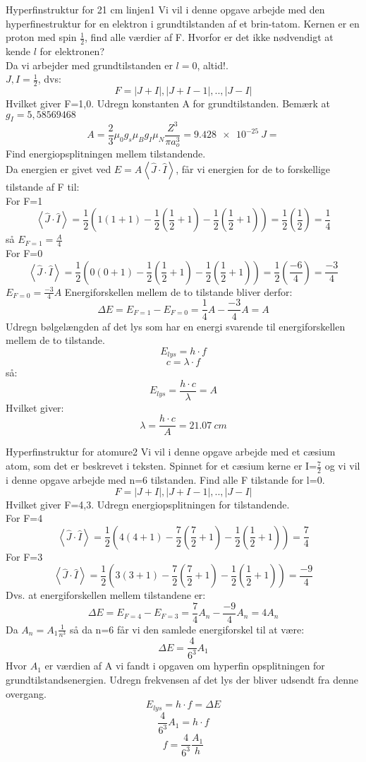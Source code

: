 \begin{opgave}{Hyperfinstruktur for 21 cm linjen}{1}
Vi vil i denne opgave arbejde med den hyperfinestruktur for en elektron i grundtilstanden af et brin-tatom.
\opg Kernen er en proton med spin $\frac{1}{2}$, find alle værdier af F. Hvorfor er det ikke nødvendigt at kende $l$ for elektronen?\\
Da vi arbejder med grundtilstanden er $l=0$, altid!.\\
$J,I=\frac{1}{2}$, dvs:
$$F=|J+I|,|J+I-1|,..,|J-I|$$
Hvilket giver F=1,0.
\opg Udregn konstanten A for grundtilstanden.
 Bemærk at $g_I = 5,58569468$
$$A=\frac{2}{3}\mu_0g_s\mu_Bg_I\mu_N\frac{Z^3}{\pi a_o^3}=\SI{9,428e-25}{J} =$$
\opg Find energiopsplitningen mellem tilstandende.\\
Da energien er givet ved $E=A\left<\hat{J}\cdot\hat{I}\right>$, får vi energien for de to forskellige tilstande af F til:\\
For F=1
$$\left<\hat{J}\cdot\hat{I}\right>=\frac{1}{2}(1(1+1)-\frac{1}{2}(\frac{1}{2}+1)-\frac{1}{2}(\frac{1}{2}+1))=\frac{1}{2}(\frac{1}{2})=\frac{1}{4}$$
så $E_{F=1}=\frac{A}{4}$\\
For F=0
$$\left<\hat{J}\cdot\hat{I}\right>=\frac{1}{2}(0(0+1)-\frac{1}{2}(\frac{1}{2}+1)-\frac{1}{2}(\frac{1}{2}+1))=\frac{1}{2}(\frac{-6}{4})=\frac{-3}{4}$$
$E_{F=0}=\frac{-3}{4}A$
Energiforskellen mellem de to tilstande bliver derfor:
$$\Delta E=E_{F=1}-E_{F=0}=\frac{1}{4}A-\frac{-3}{4}A=A$$
\opg Udregn bølgelængden af det lys som har en energi svarende til energiforskellen mellem de to tilstande.
$$E_{lys}=h\cdot f$$
$$c=\lambda\cdot f$$
så:
$$E_{lys}=\frac{h\cdot c}{\lambda}=A$$
Hvilket giver:
$$\lambda=\frac{h\cdot c}{A} = \SI{21,07}{cm}$$
\end{opgave}
\begin{opgave}{Hyperfinstruktur for atomure}{2}
Vi vil i denne opgave arbejde med et cæsium atom, som det er beskrevet i teksten.
Spinnet for et cæsium kerne er I=$\frac{7}{2}$ og vi vil i denne opgave arbejde med n=6 tilstanden.
\opg Find alle F tilstande for l=0.\\
$$F=|J+I|,|J+I-1|,..,|J-I|$$
Hvilket giver F=4,3.
\opg Udregn energiopsplitningen for tilstandende.\\
For F=4
$$\left<\hat{J}\cdot\hat{I}\right>=\frac{1}{2}(4(4+1)-\frac{7}{2}(\frac{7}{2}+1)-\frac{1}{2}(\frac{1}{2}+1))=\frac{7}{4}$$
For F=3
$$\left<\hat{J}\cdot\hat{I}\right>=\frac{1}{2}(3(3+1)-\frac{7}{2}(\frac{7}{2}+1)-\frac{1}{2}(\frac{1}{2}+1))=\frac{-9}{4}$$
Dvs. at energiforskellen mellem tilstandene er:
$$\Delta E=E_{F=4}-E_{F=3}=\frac{7}{4}A_n-\frac{-9}{4}A_n=4A_n$$
Da $A_n=A_1\frac{1}{n^3}$ så da n=6 får vi den samlede energiforskel til at være:
$$\Delta E=\frac{4}{6^3}A_1$$
Hvor $A_1$ er værdien af A vi fandt i opgaven om hyperfin opsplitningen for grundtilstandsenergien.
\opg Udregn frekvensen af det lys der bliver udsendt fra denne overgang.
$$E_{lys}=h\cdot f=\Delta E$$
$$\frac{4}{6^3}A_1=h\cdot f$$
$$f=\frac{4}{6^3}\frac{A_1}{h}$$
\end{opgave}